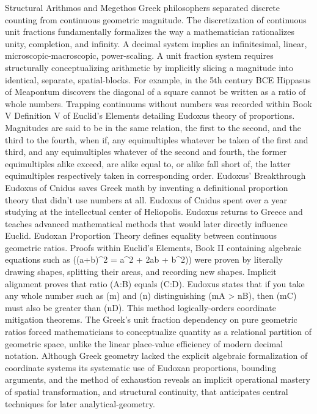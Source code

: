 {Structural Arithmos and Megethos
Greek philosophers separated discrete counting from continuous geometric magnitude. The discretization of continuous unit fractions fundamentally formalizes the way a mathematician rationalizes unity, completion, and infinity. A decimal system implies an infinitesimal, linear, microscopic-macroscopic, power-scaling. A unit fraction system requires structurally conceptualizing arithmetic by implicitly slicing a magnitude into identical, separate, spatial-blocks. For example, in the 5th century BCE Hippasus of Meapontum discovers the diagonal of a square cannot be written as a ratio of whole numbers. Trapping continuums without numbers was recorded within Book V Definition V of Euclid’s Elements detailing Eudoxus theory of proportions. 
Magnitudes are said to be in the same relation, the first to the second, and the third to the fourth, when if, any equimultiples whatever be taken of the first and third, and any equimultiples whatever of the second and fourth, the former equimultiples alike exceed, are alike equal to, or alike fall short of, the latter equimultiples respectively taken in corresponding order.
Eudoxus’ Breakthrough
Eudoxus of Cnidus saves Greek math by inventing a definitional proportion theory that didn't use numbers at all. Eudoxus of Cnidus spent over a year studying at the intellectual center of Heliopolis. Eudoxus returns to Greece and teaches advanced mathematical methods that would later directly influence Euclid. Eudoxan Proportion Theory defines equality between continuous geometric ratios. Proofs within Euclid's Elements, Book II containing algebraic equations such as ((a+b)^2 = a^2 + 2ab + b^2)) were proven by literally drawing shapes, splitting their areas, and recording new shapes. Implicit alignment proves that ratio (A:B) equals (C:D). 
Eudoxus states that if you take any whole number such as (m) and (n) distinguishing
(mA > nB), then (mC) must also be greater than (nD).
This method logically-orders coordinate mitigation theorems. The Greek’s unit fraction dependency on pure geometric ratios forced mathematicians to conceptualize quantity as a relational partition of geometric space, unlike the linear place-value efficiency of modern decimal notation. Although Greek geometry lacked the explicit algebraic formalization of coordinate systems its systematic use of Eudoxan proportions, bounding arguments, and the method of exhaustion reveals an implicit operational mastery of spatial transformation, and structural continuity, that anticipates central techniques for later analytical-geometry. 

}
